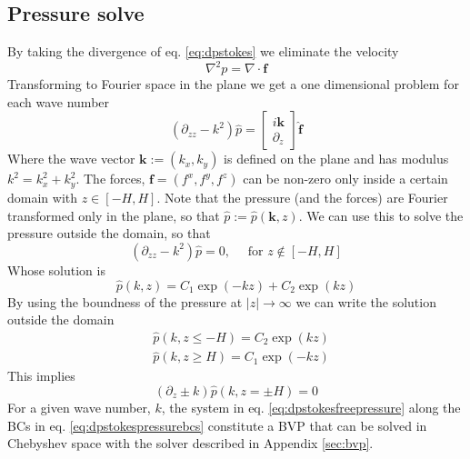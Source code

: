 \documentclass[ twoside,openright,titlepage,numbers=noenddot,%
headinclude,footinclude,cleardoublepage=empty,abstract=on,
BCOR=5mm,paper=a4,fontsize=11pt, dvipsnames
]{scrreprt}
\renewcommand{\vec}[1]{\bm{#1}}
\newcommand{\fou}[1]{\widehat{#1}}
\begin{document}
\subsection*{Pressure solve}
By taking the divergence of eq. \eqref{eq:dpstokes} we eliminate the velocity
\begin{equation}
  \label{eq:dpstokespressure}
  \nabla^2 p = \nabla\cdot\vec{f}
\end{equation}
Transforming to Fourier space in the plane we get a one dimensional problem for each wave number
\begin{equation}
  \label{eq:dpstokesfreepressure}
  (\partial_{zz}-k^2)\fou{p} =
  \begin{bmatrix}
    i\vec{k}\\
    \partial_z
  \end{bmatrix}
\fou{\vec{f}}
\end{equation}
Where the wave vector $\vec{k}:=(k_x, k_y)$ is defined on the plane and has modulus $k^2 = k_x^2 + k_y^2$. The forces, $\vec{f}=(f^x, f^y, f^z)$ can be non-zero only inside a certain domain with $z\in [-H,H]$. Note that the pressure (and the forces) are Fourier transformed only in the plane, so that $\fou{p} :=\fou{p}(\vec{k}, z)$. We can use this to solve the pressure outside the domain, so that
\begin{equation}
    (\partial_{zz}-k^2)\fou{p} = 0, \quad \text{ for } z \notin [-H,H]
\end{equation}
Whose solution is
\begin{equation}
  \fou{p}(k, z) = C_1\exp(-kz) + C_2\exp(kz)
\end{equation}
By using the boundness of the pressure at $|z|\rightarrow\infty$ we can write the solution outside the domain
\begin{equation}
  \begin{aligned}
    &\fou{p}(k,z\le -H) = C_2\exp(kz)\\
    &\fou{p}(k,z\ge H) = C_1\exp(-kz)    
  \end{aligned}
\end{equation}
This implies
\begin{equation}
  \label{eq:dpstokespressurebcs}
  (\partial_z\pm k)\fou{p}(k, z=\pm H) = 0
\end{equation}
For a given wave number, $k$, the system in eq. \eqref{eq:dpstokesfreepressure} along the \glspl{BC} in eq. \eqref{eq:dpstokespressurebcs} constitute a \gls{BVP} that can be solved in Chebyshev space with the solver described in Appendix \ref{sec:bvp}.
\end{document}
